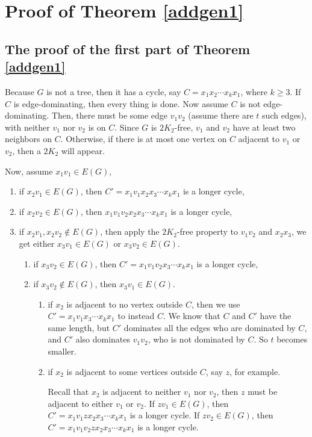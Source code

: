 \documentclass{amsart}
\theoremstyle{definition}
\begin{document}
\section{Proof of Theorem \ref{addgen1}}

\subsection{The proof of the first part of Theorem \ref{addgen1}}

Because $G$ is not a tree, then it has a cycle, say $C=x_1x_2\cdots x_kx_1$, where $k\ge3$.
If $C$ is edge-dominating, then every thing is done. Now assume $C$ is not edge-dominating. Then, there must be some edge $v_1v_2$ (assume there are $t$ such edges), with neither $v_1$ nor $v_2$ is on $C$. 
Since $G$ is $2K_2$-free, $v_1$ and $v_2$ have at least two neighbors on $C$. Otherwise, if there is at most one vertex on $C$ adjacent to $v_1$ or $v_2$, then a $2K_2$ will appear.

Now, assume $x_1v_1\in E(G)$, 
\begin{enumerate}
\item if $x_2v_1\in E(G)$, then $C'=x_1v_1x_2x_3\cdots x_kx_1$ is a longer cycle,
\item if $x_2v_2\in E(G)$, then $x_1v_1v_2x_2x_3\cdots x_kx_1$ is a longer cycle, 
\item if $x_2v_1,x_2v_2\not\in E(G)$, then apply the $2K_2$-free property to $v_1v_2$ and $x_2x_3$, we get either $x_3v_1\in E(G)$ or $x_3v_2\in E(G)$.
\begin{enumerate}
\item if $x_3v_2\in E(G)$, then $C'=x_1v_1v_2x_3\cdots x_kx_1$ is a longer cycle,
\item if $x_3v_2\not\in E(G)$, then $x_3v_1\in E(G)$.
\begin{enumerate}
\item if $x_2$ is adjacent to no vertex outside $C$, then we use $C'=x_1v_1x_3\cdots x_kx_1$ to instead $C$. We know that $C$ and $C'$ have the same length, but $C'$ dominates all the edges who are dominated by $C$, and $C'$ also dominates $v_1v_2$, who is not dominated by $C$. So $t$ becomes smaller.
\item if $x_2$ is adjacent to some vertices outside $C$, say $z$, for example.

Recall that $x_2$ is adjacent to neither $v_1$ nor $v_2$, then $z$ must be adjacent to either $v_1$ or $v_2$. If $zv_1\in E(G)$, then $C'=x_1v_1zx_2x_3\cdots x_kx_1$ is a longer cycle.
If $zv_2\in E(G)$, then $C'=x_1v_1v_2zx_2x_3\cdots x_kx_1$ is a longer cycle.
\end{enumerate}

\end{enumerate}
\end{enumerate}
\end{document}
